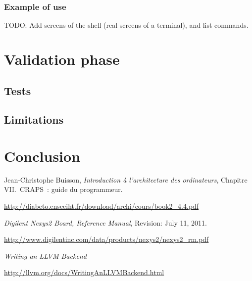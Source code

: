 \documentclass[openany, a4paper]{book}
\begin{document}
      \subsection{Example of use}
        TODO: Add screens of the shell (real screens of a terminal), and list
        commands.

  \chapter{Validation phase}

    \section{Tests}

    \section{Limitations}

  \chapter{Conclusion}

  \setcounter{chapter}{0}
  \renewcommand{\thechapter}{\Alph{chapter}}

  \patchcmd{\thebibliography}{\chapter*}{\chapter}{}{}
  \begin{thebibliography}{9}
      Jean-Christophe Buisson,
      \emph{Introduction à l'architecture des ordinateurs},
      Chapitre VII.\ CRAPS~: guide du programmeur.

      \mbox{\url{http://diabeto.enseeiht.fr/download/archi/cours/book2_4.4.pdf}}

      \emph{Digilent Nexys2 Board, Reference Manual},
      Revision: July 11, 2011.

      \mbox{\url{http://www.digilentinc.com/data/products/nexys2/nexys2_rm.pdf}}

      \emph{Writing an LLVM Backend}

      \mbox{\url{http://llvm.org/docs/WritingAnLLVMBackend.html}}
  \end{thebibliography}
\end{document}
